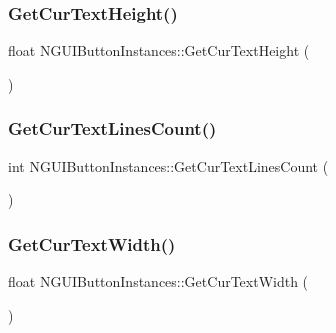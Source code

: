 \subsubsection{\texorpdfstring{Get\+Cur\+Text\+Height()}{GetCurTextHeight()}}
{\footnotesize\ttfamily float N\+G\+U\+I\+Button\+Instances\+::\+Get\+Cur\+Text\+Height (\begin{DoxyParamCaption}{ }\end{DoxyParamCaption})}

\hypertarget{class_n_g_u_i_button_instances_ae0cb23b72eacbeabcba38d9b56459900}{}\label{class_n_g_u_i_button_instances_ae0cb23b72eacbeabcba38d9b56459900} 
\subsubsection{\texorpdfstring{Get\+Cur\+Text\+Lines\+Count()}{GetCurTextLinesCount()}}
{\footnotesize\ttfamily int N\+G\+U\+I\+Button\+Instances\+::\+Get\+Cur\+Text\+Lines\+Count (\begin{DoxyParamCaption}{ }\end{DoxyParamCaption})}

\hypertarget{class_n_g_u_i_button_instances_a61c2b501c53069ff396732ed5fd78c06}{}\label{class_n_g_u_i_button_instances_a61c2b501c53069ff396732ed5fd78c06} 
\subsubsection{\texorpdfstring{Get\+Cur\+Text\+Width()}{GetCurTextWidth()}}
{\footnotesize\ttfamily float N\+G\+U\+I\+Button\+Instances\+::\+Get\+Cur\+Text\+Width (\begin{DoxyParamCaption}{ }\end{DoxyParamCaption})}

\hypertarget{class_n_g_u_i_button_instances_a01c5f4f44507d5c85b0a6153c4edf674}{}\label{class_n_g_u_i_button_instances_a01c5f4f44507d5c85b0a6153c4edf674} 
